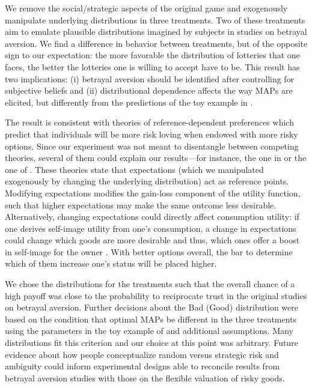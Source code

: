 We remove the social/strategic aspects of the original game and exogenously manipulate underlying distributions in three treatments.
Two of these treatments aim to emulate plausible distributions imagined by subjects in studies on betrayal aversion.
%
We find a difference in behavior between treatments, but of the opposite sign to our expectation: the more favorable the distribution of lotteries that one faces, the better the lotteries one is willing to accept have to be.
This result has two implications: (i) betrayal aversion should be identified after controlling for subjective beliefs and (ii) distributional dependence affects the way MAPs are elicited, but differently from the predictions of the toy example in \cite{Li2020a}.

The result is consistent with theories of reference-dependent preferences which predict that individuals will be more risk loving when endowed with more risky options.
Since our experiment was not meant to disentangle between competing theories, several of them could explain our results---for instance, the one in \cite{Koszegi2006,Koszegi2007} or the one of \cite{Wenner2015}.
These theories state that expectations (which we manipulated exogenously by changing the underlying distribution) act as reference points.
Modifying expectations modifies the gain-loss component of the utility function, such that higher expectations may make the same outcome less desirable.
Alternatively, changing expectations could directly affect consumption utility: if one derives self-image utility from one's consumption, a change in expectations could change which goods are more desirable and thus, which ones offer a boost in self-image for the owner \citep{Strahilevitz1998,Marzilli2011}.
With better options overall, the bar to determine which of them increase one's status will be placed higher.

We chose the distributions for the treatments such that the overall chance of a high payoff was close to the probability to reciprocate trust in the original studies on betrayal aversion.
Further decisions about the Bad (Good) distribution were based on the condition that optimal MAPs be different in the three treatments using the parameters in the toy example of \cite{Li2020a} and additional assumptions.
Many distributions fit this criterion and our choice at this point was arbitrary.
Future evidence about how people conceptualize random versus strategic risk and ambiguity could inform experimental designs able to reconcile results from betrayal aversion studies with those on the flexible valuation of risky goods.


